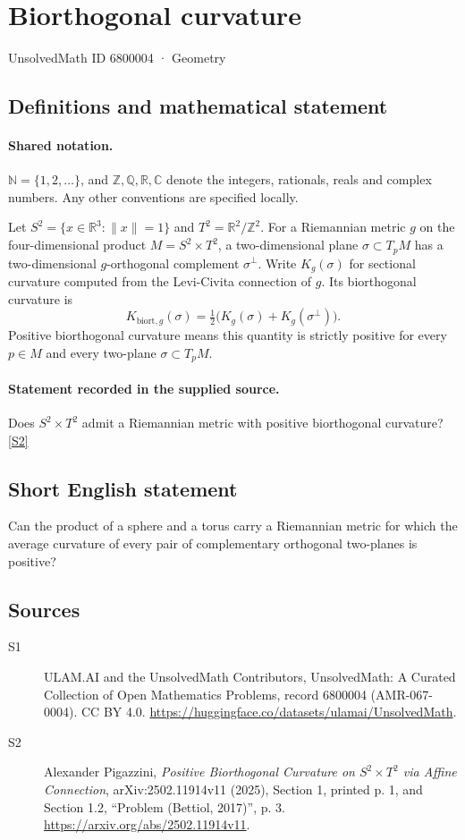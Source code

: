 \documentclass[11pt]{article}
\newcommand{\sref}[2]{\hyperlink{source:#1:#2}{[S#2]}}
\begin{document}
\setcounter{section}{6800003}
\section{Biorthogonal curvature}\label{6800004}
{\small\sffamily UnsolvedMath ID 6800004 · Geometry}
\subsection{Definitions and mathematical statement}

\paragraph{Shared notation.}$\mathbb N=\{1,2,\ldots\}$, and $\mathbb Z,\mathbb Q,\mathbb R,\mathbb C$ denote the integers, rationals, reals and complex numbers. Any other conventions are specified locally.


Let $S^2=\{x\in\mathbb R^3:\lVert x\rVert=1\}$ and $T^2=\mathbb R^2/\mathbb Z^2$. For a Riemannian metric $g$ on the four-dimensional product $M=S^2\times T^2$, a two-dimensional plane $\sigma\subset T_pM$ has a two-dimensional $g$-orthogonal complement $\sigma^\perp$. Write $K_g(\sigma)$ for sectional curvature computed from the Levi-Civita connection of $g$. Its biorthogonal curvature is
\[K_{\mathrm{biort},g}(\sigma)=\tfrac12\bigl(K_g(\sigma)+K_g(\sigma^\perp)\bigr).\]
Positive biorthogonal curvature means this quantity is strictly positive for every $p\in M$ and every two-plane $\sigma\subset T_pM$.
\paragraph{Statement recorded in the supplied source.}
Does $S^2\times T^2$ admit a Riemannian metric with positive biorthogonal curvature? \sref{6800004}{2}
\subsection{Short English statement}
Can the product of a sphere and a torus carry a Riemannian metric for which the average curvature of every pair of complementary orthogonal two-planes is positive?
\subsection{Sources}
\begin{description}
\item[\hypertarget{source:6800004:1}{S1}] ULAM.AI and the UnsolvedMath Contributors, UnsolvedMath: A Curated Collection of Open Mathematics Problems, record 6800004 (AMR-067-0004). CC BY 4.0. \url{https://huggingface.co/datasets/ulamai/UnsolvedMath}.
\item[\hypertarget{source:6800004:2}{S2}] Alexander Pigazzini, \emph{Positive Biorthogonal Curvature on $S^2\times T^2$ via Affine Connection}, arXiv:2502.11914v11 (2025), Section 1, printed p. 1, and Section 1.2, ``Problem (Bettiol, 2017)'', p. 3. \url{https://arxiv.org/abs/2502.11914v11}.
\end{description}
\label{end:6800004}
\end{document}
